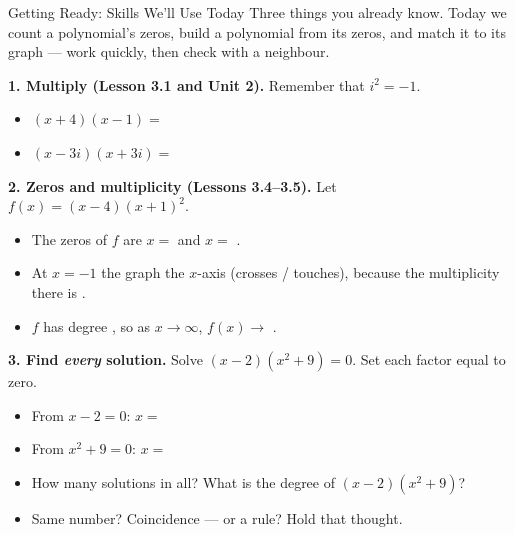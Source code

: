\documentclass[12pt]{article}
\begin{document}

\vspace{0.10in}

\begin{notesbox}{Getting Ready: Skills We'll Use Today}
Three things you already know. Today we count a polynomial's zeros, build a polynomial from its
zeros, and match it to its graph --- work quickly, then check with a neighbour.

\vspace{8pt}
\textbf{1. Multiply (Lesson 3.1 and Unit 2).} Remember that $i^2=-1$.
\begin{itemize}[leftmargin=1.6em, itemsep=8pt]
  \item $(x+4)(x-1)=$ \blank{3.4cm}
  \item $(x-3i)(x+3i)=$ \blank{3.4cm}
\end{itemize}

\vspace{8pt}
\textbf{2. Zeros and multiplicity (Lessons 3.4--3.5).} Let $f(x)=(x-4)(x+1)^2$.
\begin{itemize}[leftmargin=1.6em, itemsep=8pt]
  \item The zeros of $f$ are $x=$ \blank{1.2cm} and $x=$ \blank{1.2cm}.
  \item At $x=-1$ the graph \blank{2.2cm} the $x$-axis (crosses / touches), because the
        multiplicity there is \blank{1.0cm}.
  \item $f$ has degree \blank{1.0cm}, so as $x\to\infty$, $f(x)\to$ \blank{1.4cm}.
\end{itemize}

\vspace{8pt}
\textbf{3. Find \emph{every} solution.} Solve $(x-2)(x^2+9)=0$. Set each factor equal to zero.
\begin{itemize}[leftmargin=1.6em, itemsep=8pt]
  \item From $x-2=0$: \quad $x=$ \blank{1.4cm}
  \item From $x^2+9=0$: \quad $x=$ \blank{2.6cm}
  \item How many solutions in all? \blank{1.0cm} \quad What is the degree of $(x-2)(x^2+9)$?
        \blank{1.0cm}
  \item Same number? \blank{1.4cm} \; Coincidence --- or a rule? Hold that thought.
\end{itemize}
\end{notesbox}
\end{document}

